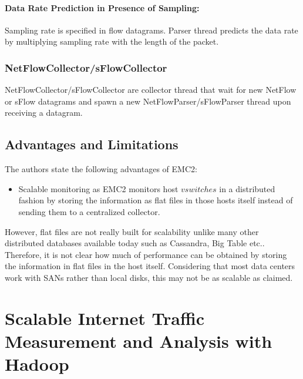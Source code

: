     \paragraph{Data Rate Prediction in Presence of Sampling:}
       Sampling rate is specified in flow datagrams. Parser thread predicts the data rate by multiplying  sampling rate with the length 
       of the packet.
   
    \subsubsection{NetFlowCollector/sFlowCollector}
      NetFlowCollector/sFlowCollector are collector thread that wait %
      for new NetFlow or sFlow datagrams and spawn a new NetFlowParser/sFlowParser thread upon receiving a datagram.
      
    \subsection{Advantages and Limitations}
    The authors state the following advantages of EMC2:

    \begin{itemize}
     \item Scalable monitoring as EMC2 monitors host $vswitches$ in a distributed fashion by storing the information as flat files in
     those hosts itself instead of sending them to a centralized collector.
    \end{itemize}
    
    However, flat files are not really built for scalability unlike many other distributed databases available today such as Cassandra, 
    Big Table etc.. Therefore, it is not clear how much of performance can be obtained by storing the information in flat files in the host 
    itself. Considering that most data centers work with SANs rather than local disks, this may not be as scalable as claimed.
    

   \section{Scalable Internet Traffic Measurement and Analysis with Hadoop\cite{Lee}}

